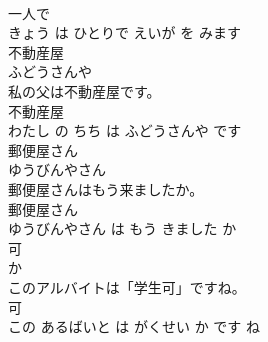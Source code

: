 \documentclass[8pt]{extreport}
\begin{document}
\begin{CJK}{UTF8}{min}
\\	一人で 
\\	きょう は ひとりで えいが を みます			
\\	不動産屋	
\\	ふどうさんや			
\\	私の父は不動産屋です。	
\\	不動産屋 
\\	わたし の ちち は ふどうさんや です			
\\	郵便屋さん	
\\	ゆうびんやさん			
\\	郵便屋さんはもう来ましたか。	
\\	郵便屋さん 
\\	ゆうびんやさん は もう きました か			
\\	可	
\\	か			
\\	このアルバイトは「学生可」ですね。	
\\	可 
\\	この あるばいと は がくせい か です ね			
\end{CJK}
\end{document}
